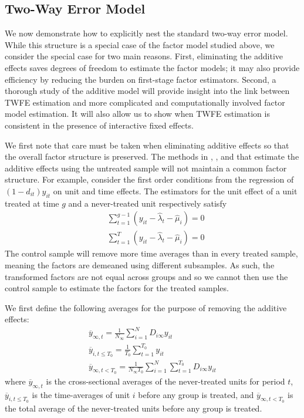\documentclass[12pt]{article}
\begin{document}
\subsection{Two-Way Error Model}

We now demonstrate how to explicitly nest the standard two-way error model. While this structure is a special case of the factor model studied above, we consider the special case for two main reasons. First, eliminating the additive effects saves degrees of freedom to estimate the factor models; it may also provide efficiency by reducing the burden on first-stage factor estimators. Second, a thorough study of the additive model will provide insight into the link between TWFE estimation and more complicated and computationally involved factor model estimation. It will also allow us to show when TWFE estimation is consistent in the presence of interactive fixed effects. 

We first note that care must be taken when eliminating additive effects so that the overall factor structure is preserved. The methods in \citet{Borusyak_Jaravel_Spiess_2021}, \citet{Gardner_2021}, and \cite{Wooldridge_2021} that estimate the additive effects using the untreated sample will not maintain a common factor structure. For example, consider the first order conditions from the regression of $(1 - d_{it})y_{it}$ on unit and time effects. The estimators for the unit effect of a unit treated at time $g$ and a never-treated unit respectively satisfy
\begin{align}
  &\sum_{t = 1}^{g-1} (y_{it} - \widehat{\lambda}_t - \widehat{\mu}_i) = 0\\
  &\sum_{t = 1}^T (y_{it} - \widehat{\lambda}_t - \widehat{\mu}_i) = 0
\end{align}
The control sample will remove more time averages than in every treated sample, meaning the factors are demeaned using different subsamples. As such, the transformed factors are not equal across groups and so we cannot then use the control sample to estimate the factors for the treated samples. 

We first define the following averages for the purpose of removing the additive effects:
\begin{gather}
  \overline{y}_{\infty , t} = \frac{1}{N_{\infty}} \sum_{i = 1}^N D_{i \infty} y_{it} \\
  \overline{y}_{i,t\leq T_0} = \frac{1}{T_0} \sum_{t = 1}^{T_0} y_{it} \\
  \overline{y}_{\infty, t < T_0} = \frac{1}{N_{\infty} T_0} \sum_{i = 1}^N \sum_{t = 1}^{T_0} D_{i \infty} y_{it}
\end{gather}
where $\overline{y}_{\infty , t}$ is the cross-sectional averages of the never-treated units for period $t$, $\overline{y}_{i,t\leq T_0}$ is the time-averages of unit $i$ before any group is treated, and $\overline{y}_{\infty, t < T_0}$ is the total average of the never-treated units before any group is treated.
\end{document}
